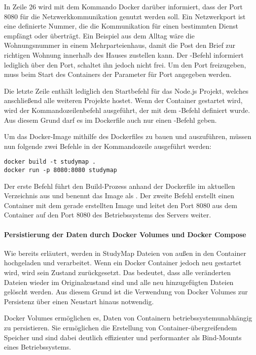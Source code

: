 In Zeile 26 wird mit dem Kommando  Docker darüber informiert, dass der Port 8080 für die Netzwerkkommunikation genutzt werden soll. Ein Netzwerkport ist eine definierte Nummer, die die Kommunikation für einen bestimmten Dienst empfängt oder überträgt. \parencite{wright_was_2022} Ein Beispiel aus dem Alltag wäre die Wohnungsnummer in einem Mehrparteienhaus, damit die Post den Brief zur richtigen Wohnung innerhalb des Hauses zustellen kann. Der -Befehl informiert lediglich über den Port, schaltet ihn jedoch nicht frei. Um den Port freizugeben, muss beim Start des Containers der Parameter  für Port angegeben werden. \parencite{docker_inc_dockerfile_2024}

Die letzte Zeile enthält lediglich den Startbefehl für das Node.js Projekt, welches anschließend alle weiteren Projekte hostet. Wenn der Container gestartet wird, wird der Kommandozeilenbefehl ausgeführt, der mit dem -Befehl definiert wurde. Aus diesem Grund darf es im Dockerfile auch nur einen -Befehl geben. \parencite{docker_inc_dockerfile_2024}

Um das Docker-Image mithilfe des Dockerfiles zu bauen und auszuführen, müssen nun folgende zwei Befehle in der Kommandozeile ausgeführt werden:
\begin{lstlisting}[style=Python]
docker build -t studymap .
docker run -p 8080:8080 studymap
\end{lstlisting}

Der erste Befehl führt den Build-Prozess anhand der Dockerfile im aktuellen Verzeichnis aus und benennt das Image als . Der zweite Befehl erstellt einen Container mit dem gerade erstellten Image und leitet den Port 8080 aus dem Container auf den Port 8080 des Betriebssystems des Servers weiter.

\paragraph*{Persistierung der Daten durch Docker Volumes und Docker Compose}
Wie bereits erläutert, werden in StudyMap Dateien von außen in den Container hochgeladen und verarbeitet. Wenn ein Docker Container jedoch neu gestartet wird, wird sein Zustand zurückgesetzt. Das bedeutet, dass alle veränderten Dateien wieder im Originalzustand sind und alle neu hinzugefügten Dateien gelöscht werden. Aus diesem Grund ist die Verwendung von Docker Volumes zur Persistenz über einen Neustart hinaus notwendig.

Docker Volumes ermöglichen es, Daten von Containern betriebssystemunabhängig zu persistieren. Sie ermöglichen die Erstellung von Container-übergreifendem Speicher und sind dabei deutlich effizienter und performanter als Bind-Mounts eines Betriebssystems. \parencite{docker_inc_volumes_0000}

